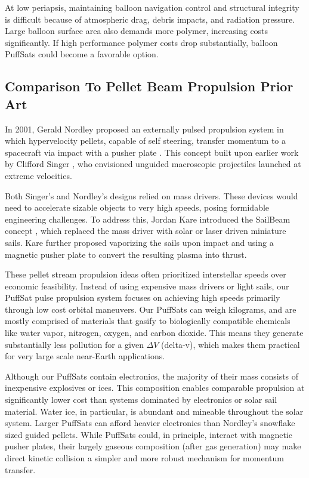 \documentclass{article}
\begin{document}
At low periapsis, maintaining balloon navigation control and structural integrity is difficult because of  atmospheric drag, debris impacts, and radiation pressure. Large balloon surface area also demands more polymer, increasing costs significantly. If high performance polymer costs drop substantially, balloon PuffSats could become a favorable option.

\subsection{Comparison To Pellet Beam Propulsion Prior Art}
In 2001, Gerald Nordley proposed an externally pulsed propulsion system in which hypervelocity pellets, capable of self steering, transfer momentum to a spacecraft via impact with a pusher plate \cite{nordley2001interstellar}. This concept built upon earlier work by Clifford Singer \cite{singer1979interstellar}, who envisioned unguided macroscopic projectiles launched at extreme velocities. 

Both Singer’s and Nordley’s designs relied on mass drivers.  These devices would need to accelerate sizable objects to very high speeds, posing formidable engineering challenges. To address this, Jordan Kare introduced the SailBeam concept \cite{kare2001sailbeam}, which replaced the mass driver with solar or laser driven miniature sails. Kare further proposed vaporizing the sails upon impact and using a magnetic pusher plate to convert the resulting plasma into thrust.   

These pellet stream propulsion ideas often prioritized interstellar speeds over economic feasibility.  Instead of using expensive mass drivers or light sails, our PuffSat pulse propulsion system focuses on achieving high speeds primarily through low cost orbital maneuvers.   Our PuffSats can weigh kilograms, and are mostly comprised of materials that gasify to biologically compatible chemicals like water vapor, nitrogen, oxygen, and carbon dioxide.   This means they generate substantially less pollution for a given $\Delta V$ (delta-v), which makes them practical for very large scale near-Earth applications.  

Although our PuffSats contain electronics, the majority of their mass consists of inexpensive explosives or ices. This composition enables comparable propulsion at significantly lower cost than systems dominated by electronics or solar sail material. Water ice, in particular, is abundant and mineable throughout the solar system.  Larger PuffSats can afford heavier electronics than Nordley's snowflake sized guided pellets.  While PuffSats could, in principle, interact with magnetic pusher plates, their largely gaseous composition (after gas generation) may make direct kinetic collision a simpler and more robust mechanism for momentum transfer. 
\end{document}
